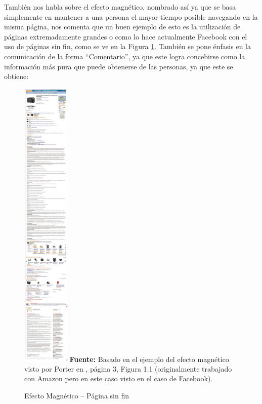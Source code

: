 \documentclass[oneside,12pt,a4paper]{memoir}%
\begin{document}
		Tambi\'en nos habla sobre el efecto magn\'etico, nombrado as\'i ya que se basa
		simplemente en mantener a una persona el mayor tiempo posible navegando en la
		misma p\'agina, nos comenta que un buen ejemplo de esto es la utilizaci\'on de
		p\'aginas extremadamente grandes o como lo hace actualmente Facebook con el
		uso de p\'aginas sin fin, como se ve en la Figura \ref{fig:amazon}.
		Tambi\'en se pone \'enfasis en la comunicaci\'on de la forma ``Comentario'',
		ya que este logra concebirse como la informaci\'on m\'as pura que puede
		obtenerse de las personas, ya que este se obtiene:
		
		\begin{figure}[here]
			\centering
			\caption{Efecto Magn\'etico -- P\'agina sin fin}
			\includegraphics[width=0.2\textwidth]{figure/fig_amazon.PNG}
			\newline
			\textbf{Fuente:} Basado en el ejemplo del efecto magn\'etico visto por
			Porter en \cite{Porter2008}, p\'agina 3, Figura 1.1 (originalmente
			trabajado con Amazon pero en este caso visto en el caso de Facebook).
			\label{fig:amazon}
		\end{figure}
		
\end{document}
